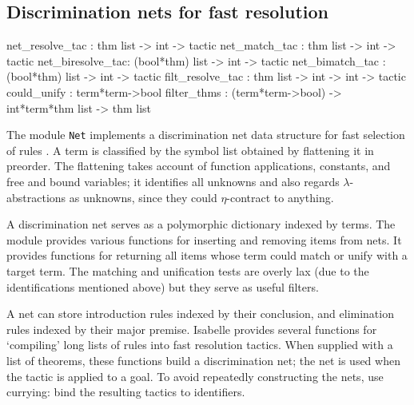 \subsection{Discrimination nets for fast resolution}\label{filt_resolve_tac}
\begin{ttbox} 
net_resolve_tac  : thm list -> int -> tactic
net_match_tac    : thm list -> int -> tactic
net_biresolve_tac: (bool*thm) list -> int -> tactic
net_bimatch_tac  : (bool*thm) list -> int -> tactic
filt_resolve_tac : thm list -> int -> int -> tactic
could_unify      : term*term->bool
filter_thms      : (term*term->bool) -> int*term*thm list -> thm list
\end{ttbox}
The module {\tt Net} implements a discrimination net data structure for
fast selection of rules \cite[Chapter 14]{charniak80}.  A term is
classified by the symbol list obtained by flattening it in preorder.
The flattening takes account of function applications, constants, and free
and bound variables; it identifies all unknowns and also regards
$\lambda$-abstractions as unknowns, since they could $\eta$-contract to
anything.  

A discrimination net serves as a polymorphic dictionary indexed by terms.
The module provides various functions for inserting and removing items from
nets.  It provides functions for returning all items whose term could match
or unify with a target term.  The matching and unification tests are
overly lax (due to the identifications mentioned above) but they serve as
useful filters.

A net can store introduction rules indexed by their conclusion, and
elimination rules indexed by their major premise.  Isabelle provides
several functions for `compiling' long lists of rules into fast
resolution tactics.  When supplied with a list of theorems, these functions
build a discrimination net; the net is used when the tactic is applied to a
goal.  To avoid repeatedly constructing the nets, use currying: bind the
resulting tactics to \ML{} identifiers.

